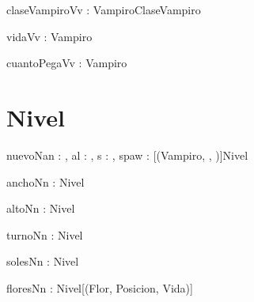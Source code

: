 \documentclass[spanish,a4paper]{article}
\begin{document}
\begin{problema}{claseVampiroV}{v : Vampiro}{ClaseVampiro}
\end{problema}

\begin{problema}{vidaV}{v : Vampiro}{\ent}
\end{problema}

\begin{problema}{cuantoPegaV}{v : Vampiro}{\ent}
\end{problema}


\section{Nivel}


\begin{problema}{nuevoN}{an : \ent, al : \ent, s : \ent, spaw : [(Vampiro, \ent, \ent)]}{Nivel}
\end{problema}

\begin{problema}{anchoN}{n : Nivel}{\ent}
\end{problema}

\begin{problema}{altoN}{n : Nivel}{\ent}
\end{problema}

\begin{problema}{turnoN}{n : Nivel}{\ent}
\end{problema}

\begin{problema}{solesN}{n : Nivel}{\ent}
\end{problema}

\begin{problema}{floresN}{n : Nivel}{[(Flor, Posicion, Vida)]}
\end{problema}
\end{document}
